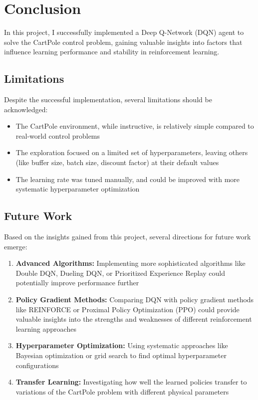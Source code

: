 \documentclass{article}
\begin{document}
\section{Conclusion}
In this project, I successfully implemented a Deep Q-Network (DQN) agent to solve the CartPole control problem, gaining valuable insights into factors that influence learning performance and stability in reinforcement learning.

\subsection{Limitations}
Despite the successful implementation, several limitations should be acknowledged:

\begin{itemize}
    \item The CartPole environment, while instructive, is relatively simple compared to real-world control problems
    \item The exploration focused on a limited set of hyperparameters, leaving others (like buffer size, batch size, discount factor) at their default values
    \item The learning rate was tuned manually, and could be improved with more systematic hyperparameter optimization
\end{itemize}

\subsection{Future Work}
Based on the insights gained from this project, several directions for future work emerge:

\begin{enumerate}
    \item \textbf{Advanced Algorithms:} Implementing more sophisticated algorithms like Double DQN, Dueling DQN, or Prioritized Experience Replay could potentially improve performance further
    
    \item \textbf{Policy Gradient Methods:} Comparing DQN with policy gradient methods like REINFORCE or Proximal Policy Optimization (PPO) could provide valuable insights into the strengths and weaknesses of different reinforcement learning approaches
    
    \item \textbf{Hyperparameter Optimization:} Using systematic approaches like Bayesian optimization or grid search to find optimal hyperparameter configurations
    
    \item \textbf{Transfer Learning:} Investigating how well the learned policies transfer to variations of the CartPole problem with different physical parameters
\end{enumerate}
\end{document}
